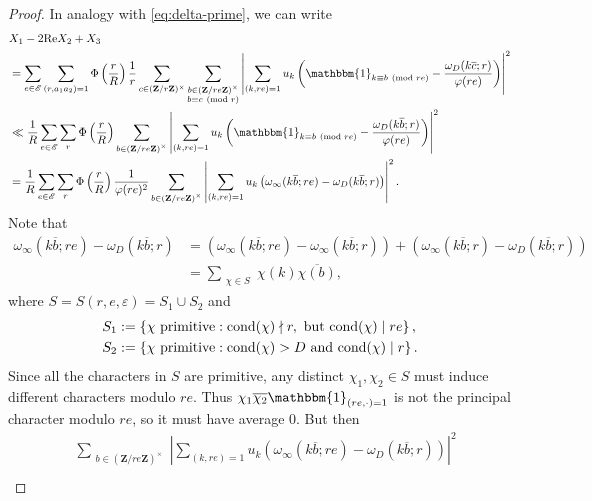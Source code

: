 \documentclass[reqno,11pt]{amsart}
\theoremstyle{definition}
\theoremstyle{remark}
\numberwithin{equation}{section}
\newcommand{\Z}{\mathbf{Z}}
\newcommand{\msE}{\mathscr{E}}
\newcommand{\one}{\mathbbm{1}}
\renewcommand{\Re}{\textnormal{Re}}
\newcommand{\eps}{\varepsilon}
\renewcommand{\bar}{\overline}
\newcommand{\cond}{\textnormal{cond}}
\renewcommand{\pmod}[1]{\ (\textnormal{mod } #1)}
\begin{document}
\begin{proof}
In analogy with \cref{eq:delta-prime}, we can write
\[
\begin{aligned}
    &X_1 - 2\Re X_2 + X_3 
    \\
    &=
    \sum_{e \in \msE} \sum_{(r, a_1a_2) = 1}  \Phi\left(\frac{r}{R}\right) \frac{1}{r} \sum_{c \in (\Z/r\Z)^\times} \sum_{\substack{b \in (\Z/re\Z)^\times \\ b \equiv c \pmod{r}}} \left\vert \sum_{(k,re)=1} u_k \left(\one_{k \equiv b \pmod{re}} - \frac{\omega_D(k\bar{c}; r)}{\varphi(re)} \right)\right\vert^2
    \\
    &\ll
    \frac{1}{R} \sum_{e \in \msE} \sum_{r} \Phi\left(\frac{r}{R}\right) \sum_{\substack{b \in (\Z/re\Z)^\times}} \left\vert \sum_{(k,re)=1} u_k \left(\one_{k \equiv b \pmod{re}} - \frac{\omega_D(k\bar{b}; r)}{\varphi(re)} \right)\right\vert^2
    \\
    &=
    \frac{1}{R} \sum_{e \in \msE} \sum_r \Phi\left(\frac{r}{R}\right) \frac{1}{\varphi(re)^2} \sum_{\substack{b \in (\Z/re\Z)^\times}} \left\vert \sum_{(k,re)=1} u_k \left(\omega_\infty(k\bar{b}; re) - \omega_D(k\bar{b}; r) \right)\right\vert^2.
\end{aligned}
\]
Note that
\[
\begin{aligned}
    \omega_\infty(k\bar{b}; re) - \omega_D(k\bar{b}; r)
    &=
    \left( \omega_\infty(k\bar{b}; re) - \omega_\infty(k\bar{b}; r) \right) + \left( \omega_\infty(k\bar{b}; r) - \omega_D(k\bar{b}; r) \right)
    \\
    &=
    \sum_{\substack{\chi \in S}} \chi(k)\bar{\chi(b)},
\end{aligned}
\]
where $S = S(r,e,\eps) = S_1 \cup S_2$ and
\[
\begin{aligned}
    S_1 &:= \left\{ \chi \text{ primitive} : \cond(\chi) \nmid r, \text{ but } \cond(\chi) \mid re \right\},
    \\
    S_2 &:=
    \left\{ \chi \text{ primitive} : \cond(\chi) > D \text{ and } \cond(\chi) \mid r \right\}.
\end{aligned}
\]
Since all the characters in $S$ are primitive, any distinct $\chi_1, \chi_2 \in S$ must induce different characters modulo $re$. Thus $\chi_1 \bar{\chi_2} \one_{(re, \cdot) = 1}$ is not the principal character modulo $re$, so it must have average $0$. But then
\[
\begin{aligned}
    &\sum_{\substack{b \in (\Z/re\Z)^\times}} \left\vert \sum_{(k,re)=1} u_k \left(\omega_\infty(k\bar{b}; re) - \omega_D(k\bar{b}; r) \right)\right\vert^2
    \\

\end{aligned}\]
\end{proof}
\end{document}
